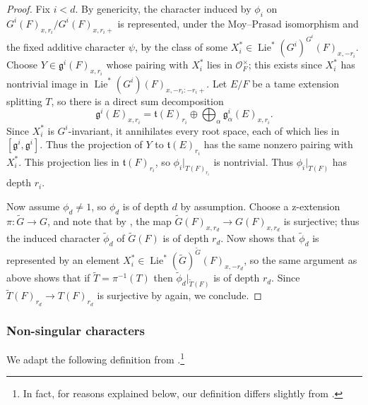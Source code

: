 \documentclass[reqno]{amsart}
\numberwithin{equation}{subsection}
\newcommand{\wt}[1]{\widetilde{#1}}
\newcommand{\co}{\colon}
\newcommand\cO{\mathcal{O}}
\newcommand\frg{\mathfrak{g}}
\newcommand\frt{\mathfrak{t}}
\DeclareMathOperator{\Lie}{Lie}
\theoremstyle{remark}
\numberwithin{equation}{subsection}
\numberwithin{figure}{subsection}
\begin{document}
\begin{proof}
Fix $i < d$. By genericity, the character induced by $\phi_i$ on $G^i(F)_{x,r_i}/G^i(F)_{x,r_i+}$ is represented, under the Moy--Prasad isomorphism and the fixed additive character $\psi$, by the class of some $X_i^*\in\Lie^*(G^i)^{G^i}(F)_{x,-r_i}$. Choose $Y\in\frg^i(F)_{x,r_i}$ whose pairing with $X_i^*$ lies in $\cO_F^\times$; this exists since $X_i^*$ has nontrivial image in $\Lie^*(G^i)(F)_{x,-r_i:-r_i+}$. Let $E/F$ be a tame extension splitting $T$, so there is a direct sum decomposition
\[
    \frg^i(E)_{x,r_i}
    =\frt(E)_{r_i}\oplus\bigoplus_\alpha\frg^i_\alpha(E)_{x,r_i}.
\]
Since $X_i^*$ is $G^i$-invariant, it annihilates every root space, each of which lies in $[\frg^i,\frg^i]$. Thus the projection of $Y$ to $\frt(E)_{r_i}$ has the same nonzero pairing with $X_i^*$. This projection lies in $\frt(F)_{r_i}$, so $\phi_i|_{T(F)_{r_i}}$ is nontrivial. Thus $\phi_i|_{T(F)}$ has depth $r_i$.

Now assume $\phi_d \neq 1$, so $\phi_d$ is of depth $d$ by assumption. Choose a z-extension $\pi\co \wt G \to G$, and note that by \cite[Lemma 3.5.3]{Kal19}, the map $\wt G(F)_{x,r_d} \to G(F)_{x,r_d}$ is surjective; thus the induced character $\wt\phi_d$ of $\wt G(F)$ is of depth $r_d$. Now \cite[Lemma 3.5.2]{Kal19} shows that $\wt\phi_d$ is represented by an element $X_i^* \in \Lie^*(\wt G)^{\wt G}(F)_{x,-r_d}$, so the same argument as above shows that if $\wt T = \pi^{-1}(T)$ then $\wt\phi_d|_{\wt T(F)}$ is of depth $r_d$. Since $\wt T(F)_{r_d} \to T(F)_{r_d}$ is surjective by \cite[Lemma 3.5.3]{Kal19} again, we conclude.
\end{proof}

\subsubsection{Non-singular characters}
We adapt the following definition from \cite[Definition 3.1.1]{Kal21b}.\footnote{In fact, for reasons explained below, our definition differs slightly from \cite[Definition 3.1.1]{Kal21b}.}
\end{document}
